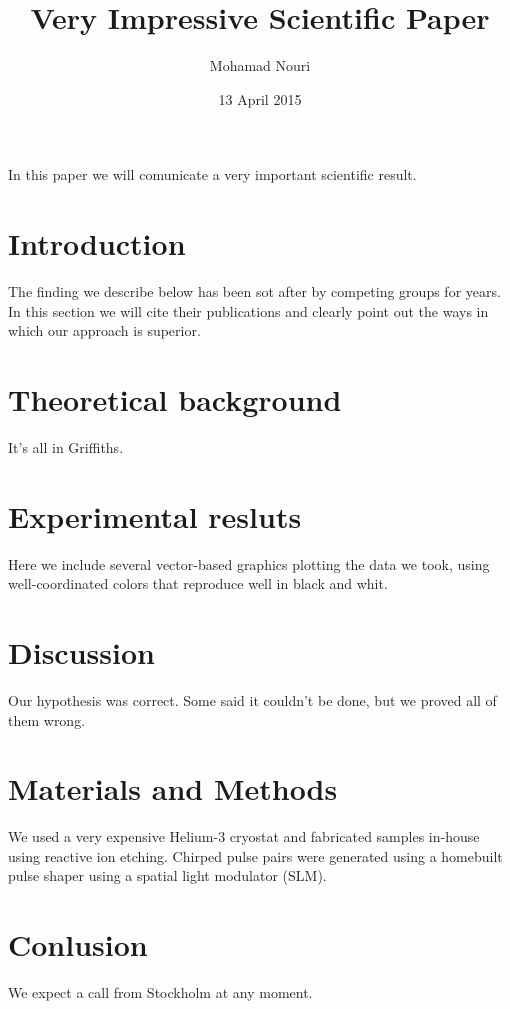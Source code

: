 \documentclass[11pt]{amsart}
\title{Very Impressive Scientific Paper}
\author{Mohamad Nouri}
\date{13 April 2015}
\begin{document}
\maketitle

In this paper we will comunicate a very important scientific result.

\section{Introduction}

The finding we describe below has been sot after by competing groups
for years. In this section we will cite their publications and clearly
point out the ways in which our approach is superior.

\section{Theoretical background}

It's all in Griffiths.

\section{Experimental resluts}

Here we include several vector-based graphics plotting the data we
took, using well-coordinated colors that reproduce well in black and
whit.

\section{Discussion}

Our hypothesis was correct. Some said it couldn't be done, but we
proved all of them wrong.

\section{Materials and Methods}

We used a very expensive Helium-3 cryostat and fabricated samples
in-house using reactive ion etching. Chirped pulse pairs were
generated using a homebuilt pulse shaper using a spatial light
modulator (SLM).

\section{Conlusion}

We expect a call from Stockholm at any moment.
\end{document}
